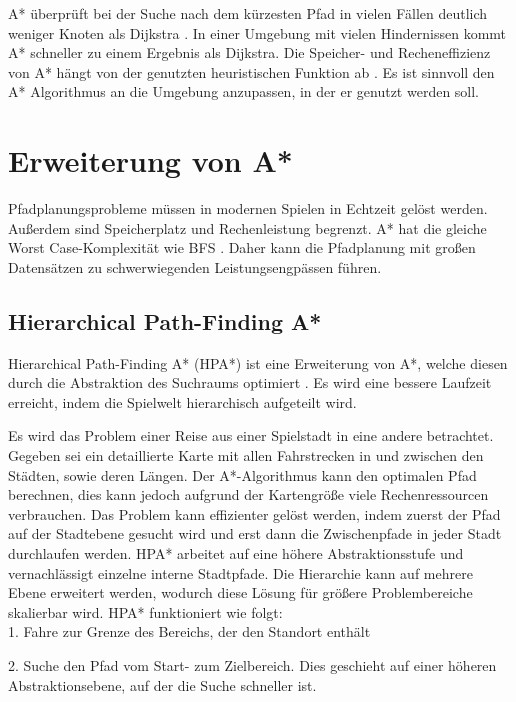 A* überprüft bei der Suche nach dem kürzesten Pfad in vielen Fällen deutlich weniger Knoten als Dijkstra \cite[S.20f]{Kri09}. In einer Umgebung mit vielen Hindernissen kommt A* schneller zu einem Ergebnis als Dijkstra. Die Speicher- und Recheneffizienz von A* hängt von der genutzten heuristischen Funktion ab \cite[S.237]{Noo15}. Es ist sinnvoll den A* Algorithmus an die Umgebung anzupassen, in der er genutzt werden soll.

\section{Erweiterung von A*}
Pfadplanungsprobleme müssen in modernen Spielen in Echtzeit gelöst werden. Außerdem sind Speicherplatz und Rechenleistung begrenzt. A* hat die gleiche Worst Case-Komplexität wie BFS \cite[S.44]{You19}. Daher kann die Pfadplanung mit großen Datensätzen zu schwerwiegenden Leistungsengpässen führen.


\subsection{Hierarchical Path-Finding A*}
\label{sec:hpa}
Hierarchical Path-Finding A* (HPA*) ist eine Erweiterung von A*, welche diesen durch die Abstraktion des Suchraums optimiert \cite{Bot04}. Es wird eine bessere Laufzeit erreicht, indem die Spielwelt hierarchisch aufgeteilt wird.

Es wird das Problem einer Reise aus einer Spielstadt in eine andere betrachtet. Gegeben sei ein detaillierte Karte mit allen Fahrstrecken in und zwischen den Städten, sowie deren Längen. Der A*-Algorithmus kann den optimalen Pfad berechnen, dies kann jedoch aufgrund der Kartengröße viele Rechenressourcen verbrauchen. Das Problem kann effizienter gelöst werden, indem zuerst der Pfad auf der Stadtebene gesucht wird und erst dann die Zwischenpfade in jeder Stadt durchlaufen werden. HPA* arbeitet auf eine höhere Abstraktionsstufe und vernachlässigt einzelne interne Stadtpfade. Die Hierarchie kann auf mehrere Ebene erweitert werden, wodurch diese Lösung für größere Problembereiche skalierbar wird. HPA* funktioniert wie folgt:\\

1. Fahre zur Grenze des Bereichs, der den Standort enthält

2. Suche den Pfad vom Start- zum Zielbereich. Dies geschieht auf einer höheren Abstraktionsebene, auf der die Suche schneller ist.

